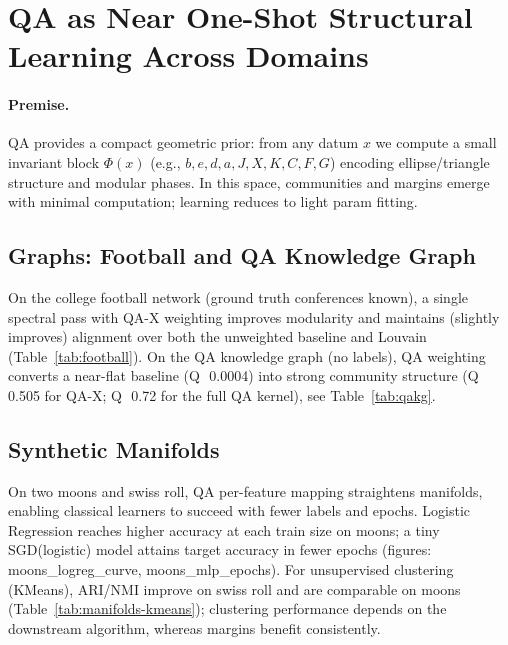 
\section{QA as Near One-Shot Structural Learning Across Domains}

\paragraph{Premise.} QA provides a compact geometric prior: from any datum $x$ we compute a small invariant block $\Phi(x)$ (e.g., $b,e,d,a,J,X,K,C,F,G$) encoding ellipse/triangle structure and modular phases. In this space, communities and margins emerge with minimal computation; learning reduces to light param fitting.

\subsection{Graphs: Football and QA Knowledge Graph}
\label{subsec:graphs}
On the college football network (ground truth conferences known), a single spectral pass with QA-X weighting improves modularity and maintains (slightly improves) alignment over both the unweighted baseline and Louvain (Table~\ref{tab:football}). On the QA knowledge graph (no labels), QA weighting converts a near-flat baseline (Q~\,0.0004) into strong community structure (Q~\,0.505 for QA-X; Q~\,0.72 for the full QA kernel), see Table~\ref{tab:qakg}.

\subsection{Synthetic Manifolds}
\label{subsec:manifolds}
On two moons and swiss roll, QA per-feature mapping straightens manifolds, enabling classical learners to succeed with fewer labels and epochs. Logistic Regression reaches higher accuracy at each train size on moons; a tiny SGD(logistic) model attains target accuracy in fewer epochs (figures: moons\_logreg\_curve, moons\_mlp\_epochs). For unsupervised clustering (KMeans), ARI/NMI improve on swiss roll and are comparable on moons (Table~\ref{tab:manifolds-kmeans}); clustering performance depends on the downstream algorithm, whereas margins benefit consistently.

